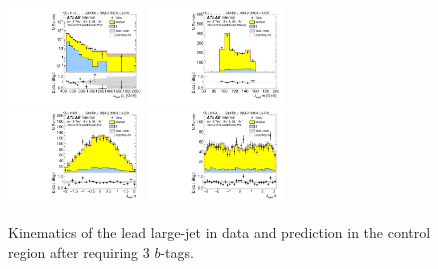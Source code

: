 \clearpage

\begin{figure}[htbp!]
\begin{center}
\includegraphics[width=0.32\textwidth,angle=-90]{figures/boosted/Control/b77_ThreeTag_Control_leadHCand_Pt_m_1.pdf}
\includegraphics[width=0.32\textwidth,angle=-90]{figures/boosted/Control/b77_ThreeTag_Control_leadHCand_Mass_s.pdf}\\
\includegraphics[width=0.32\textwidth,angle=-90]{figures/boosted/Control/b77_ThreeTag_Control_leadHCand_Eta.pdf}
\includegraphics[width=0.32\textwidth,angle=-90]{figures/boosted/Control/b77_ThreeTag_Control_leadHCand_Phi.pdf}
  \caption{Kinematics of the lead large-\R jet in data and prediction in the control region after requiring 3 $b$-tags. }
  \label{fig:boosted-3b-control-ak10-lead}
\end{center}
\end{figure}

